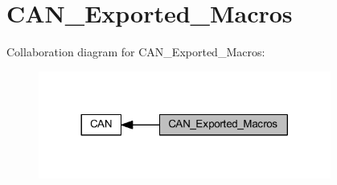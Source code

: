 \hypertarget{group___c_a_n___exported___macros}{}\section{C\+A\+N\+\_\+\+Exported\+\_\+\+Macros}
\label{group___c_a_n___exported___macros}
Collaboration diagram for C\+A\+N\+\_\+\+Exported\+\_\+\+Macros\+:
\nopagebreak
\begin{figure}[H]
\begin{center}
\leavevmode
\includegraphics[width=272pt]{group___c_a_n___exported___macros}
\end{center}
\end{figure}
